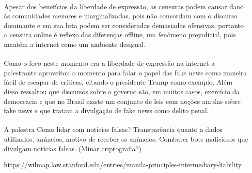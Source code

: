 \documentclass[12pt]{article}
\begin{document}
	\paragraph{}		
		Apesar dos benefícios da liberdade de expressão, as censuras podem
		causar dano às comunidades menores e marginalizadas, pois não concordam com o
		discurso dominante e em sua luta podem ser consideradas demasiadas
		ofensivas, portanto a censura online é reflexo das diferenças offline, um
		fenômeno prejudicial, pois mantém a internet como um ambiente desigual.
	\paragraph{}
		Como o foco neste momento era a liberdade de expressão na internet a 
		palestrante aproveitou o momento para falar o papel das fake news como
		maneira fácil de escapar de críticas, citando o presidente Trump como exemplo.	
		Além disso ressaltou que discursos sobre o governo são, em muitos casos,
		exercício da democracia e que no Brasil existe um conjunto de leis com noções 
		amplas sobre fake news e que tratam a divulgação de fake news como delito 
		penal.
	\paragraph{}
		A palestra 
Como lidar com notícias falsas? Transparência quanto a dados utilizados,
anúncios, motivo de receber os anúncios. Combater bots maliciosos que
divulgam notícias falsas. (Minar criptografia?)

https://wilmap.law.stanford.edu/entries/manila-principles-intermediary-liability
\end{document}
